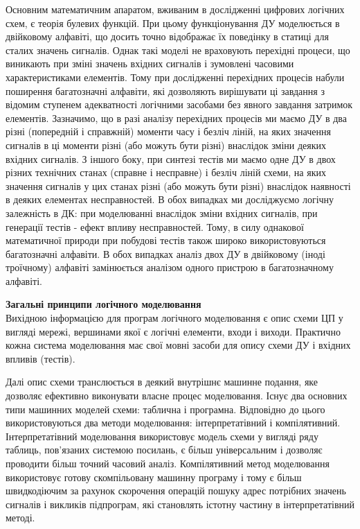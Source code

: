 \documentclass[12pt,a4paper]{article}
\begin{document}
Основним математичним апаратом, вживаним в дослідженні цифрових логічних схем, є теорія булевих функцій. При цьому функціонування ДУ моделюється в двійковому алфавіті, що досить точно відображає їх поведінку в статиці для сталих значень сигналів. Однак такі моделі не враховують перехідні процеси, що виникають при зміні значень вхідних сигналів і зумовлені часовими характеристиками елементів. Тому при дослідженні перехідних процесів набули поширення багатозначні алфавіти, які дозволяють вирішувати ці завдання з відомим ступенем адекватності логічними засобами без явного завдання затримок елементів. Зазначимо, що в разі аналізу перехідних процесів ми маємо ДУ в два різні (попередній і справжній) моменти часу і безліч ліній, на яких значення сигналів в ці моменти різні (або можуть бути різні) внаслідок зміни деяких вхідних сигналів. З іншого боку, при синтезі тестів ми маємо одне ДУ в двох різних технічних станах (справне і несправне) і безліч ліній схеми, на яких значення сигналів у цих станах різні (або можуть бути різні) внаслідок наявності в деяких елементах несправностей. В обох випадках ми досліджуємо логічну залежність в ДК: при моделюванні внаслідок зміни вхідних сигналів, при генерації тестів - ефект впливу несправностей. Тому, в силу однакової математичної природи при побудові тестів також широко використовуються багатозначні алфавіти. В обох випадках аналіз двох ДУ в двійковому (іноді троїчному) алфавіті замінюється аналізом одного пристрою в багатозначному алфавіті.


\textbf{Загальні принципи логічного моделювання}\\
Вихідною інформацією для програм логічного моделювання є опис схеми ЦП у вигляді мережі, вершинами якої є логічні елементи, входи і виходи. Практично кожна система моделювання має свої мовні засоби для опису схеми ДУ і вхідних впливів (тестів).

Далі опис схеми транслюється в деякий внутрішнє машинне подання, яке дозволяє ефективно виконувати власне процес моделювання. Існує два основних типи машинних моделей схеми: таблична і програмна. Відповідно до цього використовуються два методи моделювання: інтерпретатівний і компілятивний. Інтерпретатівний моделювання використовує модель схеми у вигляді ряду таблиць, пов'язаних системою посилань, є більш універсальним і дозволяє проводити більш точний часовий аналіз. Компілятивний метод моделювання використовує готову скомпільовану машинну програму і тому є більш швидкодіючим за рахунок скорочення операцій пошуку адрес потрібних значень сигналів і викликів підпрограм, які становлять істотну частину в інтерпретатівний методі.
\end{document}

